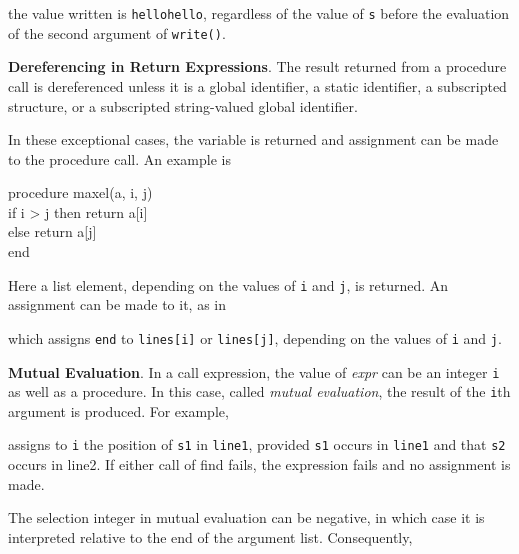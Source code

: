 
\noindent the value written is \texttt{hellohello}, regardless of the
value of \texttt{s} before the evaluation of the second argument of
\texttt{write()}.


\textbf{Dereferencing in Return Expressions}. The result returned from
a procedure call is dereferenced unless it is a global identifier, a
static identifier, a subscripted structure, or a subscripted
string-valued global identifier.

In these exceptional cases, the variable is returned and assignment
can be made to the procedure call. An example is

\begin{iconcode}
\>procedure maxel(a, i, j)\\
\>\>if i > j then return a[i]\\
\>\>else return a[j]\\
\>end
\end{iconcode}

Here a list element, depending on the values of \texttt{i} and
\texttt{j}, is returned. An assignment can be made to it, as in


\noindent which assigns \texttt{{\textquotedbl}end{\textquotedbl}} to
\texttt{lines[i]} or \texttt{lines[j]}, depending on the values of
\texttt{i} and \texttt{j}.


\PrimaryIndex
\textbf{Mutual Evaluation}. In a call expression, the value of
\textit{expr}\textit{} can be an integer
\texttt{i} as well as a procedure. In this case, called
\textit{mutual evaluation}, the result of the \texttt{i}th
argument is produced. For example,


\noindent assigns to \texttt{i} the position of \texttt{s1} in
\texttt{line1}, provided \texttt{s1} occurs in \texttt{line1} and that
\texttt{s2} occurs in line2. If either call of find fails, the
expression fails and no assignment is made.

The selection integer in mutual evaluation can be negative, in which
case it is interpreted relative to the end of the argument
list. Consequently,


